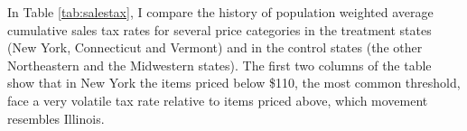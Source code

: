 \documentclass[12pt]{article}
\begin{document}
	
	
	
	
	
	

			
	In Table \ref{tab:salestax}, I compare the history of population weighted average cumulative sales tax rates for several price categories in the treatment states (New York, Connecticut and Vermont) and in the control states (the other Northeastern and the Midwestern states). The first two columns of the table show that in New York the items priced below \$110, the most common threshold, face a very volatile tax rate  relative to items priced above, which movement resembles Illinois. 
	
\end{document}
